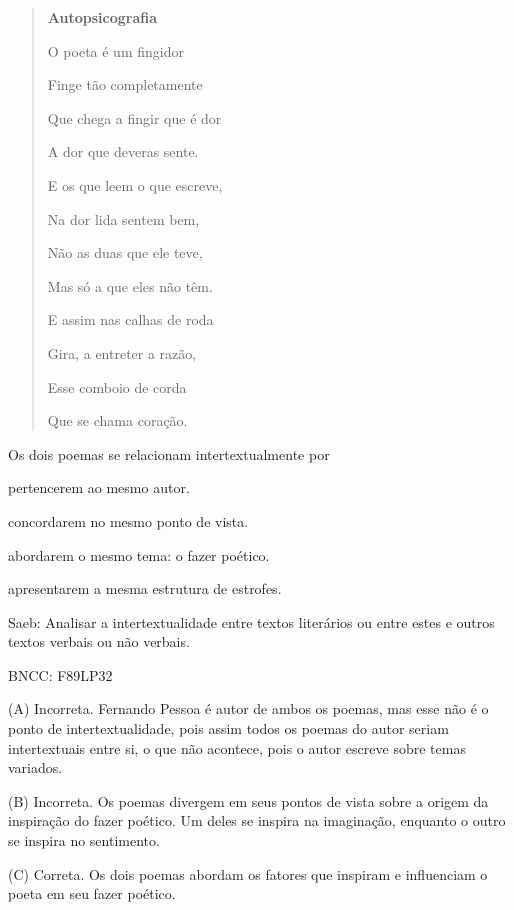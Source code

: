 \begin{quote}
\textbf{Autopsicografia}

O poeta é um fingidor

Finge tão completamente

Que chega a fingir que é dor

A dor que deveras sente.

E os que leem o que escreve,

Na dor lida sentem bem,

Não as duas que ele teve,

Mas só a que eles não têm.

E assim nas calhas de roda

Gira, a entreter a razão,

Esse comboio de corda

Que se chama coração.
\end{quote}


Os dois poemas se relacionam intertextualmente por

\begin{escolha}
\item pertencerem ao mesmo autor.

\item concordarem no mesmo ponto de vista.

\item abordarem o mesmo tema: o fazer poético.

\item apresentarem a mesma estrutura de estrofes.
\end{escolha}

Saeb: Analisar a intertextualidade entre textos literários ou entre
estes e outros textos verbais ou não verbais.

BNCC: F89LP32

(A) Incorreta. Fernando Pessoa é autor de ambos os poemas, mas esse não
é o ponto de intertextualidade, pois assim todos os poemas do autor
seriam intertextuais entre si, o que não acontece, pois o autor escreve
sobre temas variados.

(B) Incorreta. Os poemas divergem em seus pontos de vista sobre a origem
da inspiração do fazer poético. Um deles se inspira na imaginação,
enquanto o outro se inspira no sentimento.

(C) Correta. Os dois poemas abordam os fatores que inspiram e
influenciam o poeta em seu fazer poético.

